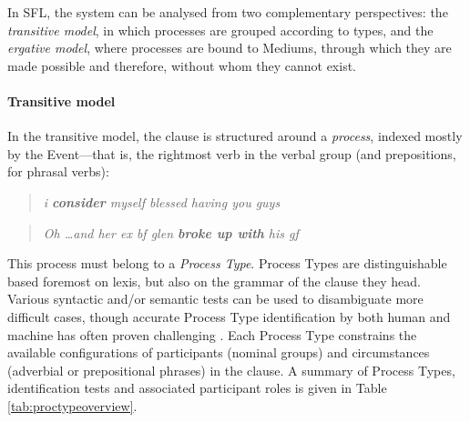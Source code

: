 In \gls{SFL}, the  system can be analysed from two complementary perspectives: the \emph{transitive model}, in which processes are grouped according to types, and the \emph{ergative model}, where processes are bound to Mediums, through which they are made possible and therefore, without whom they cannot exist.

\paragraph{Transitive model}

In the transitive model, the clause is structured around a \emph{process}, indexed mostly by the Event---that is, the rightmost verb in the verbal group (and prepositions, for phrasal verbs):

\begin{multicols}{2}
\begin{quote}
\emph{i \textbf{consider} myself blessed having you guys}  %
\end{quote}
\begin{quote}
\emph{Oh \dots and her ex bf glen \textbf{broke up with} his gf} %
\end{quote}
\end{multicols}
%
\noindent This process must belong to a \emph{Process Type}. Process Types are distinguishable based foremost on lexis, but also on the grammar of the clause they head. Various syntactic and\slash or semantic tests can be used to disambiguate more difficult cases, though accurate Process Type identification by both human and machine has often proven challenging \cite{odonnell_survey_2009}. Each Process Type constrains the available configurations of participants (nominal groups) and circumstances (adverbial or prepositional phrases) in the clause. A summary of Process Types, identification tests and associated participant roles is given in Table \ref{tab:proctypeoverview}.

